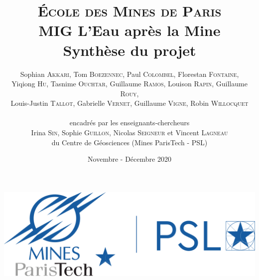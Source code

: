\documentclass{article}
\title{ \textbf{ {\color{couleurmines}
\Huge{\textsc{École des Mines de Paris}}\\
\vspace{1.5 cm}
MIG L'Eau après la Mine\\\vspace{1 cm}Synthèse du projet}}
\vspace{1 cm}
}
\author{%
Sophian \textsc{Akkari},
Tom \textsc{Boezennec}, 
Paul \textsc{Colombel}, 
Florestan \textsc{Fontaine},\\
Yiqiong \textsc{Hu}, 
Tasnime \textsc{Ouchtar}, 
Guillaume \textsc{Ramos}, 
Louison \textsc{Rapin}, 
Guillaume \textsc{Rouy},\\ 
Louis-Justin \textsc{Tallot}, 
Gabrielle \textsc{Vernet}, 
Guillaume \textsc{Vigne}, 
Robin \textsc{Willocquet}\\
\\
encadrés par les enseignants-chercheurs \\
Irina \textsc{Sin}, 
Sophie \textsc{Guillon}, 
Nicolas \textsc{Seigneur}
et Vincent \textsc{Lagneau} \\
du Centre de Géosciences (Mines ParisTech - PSL)}
\date{Novembre - Décembre 2020}
\begin{document}

\maketitle
\thispagestyle{empty}
\vspace{1 cm}
\begin{center}
    \includegraphics[width = 0.4\linewidth]{logoMPT.png}
\end{center}
\newpage
{}
\end{document}
